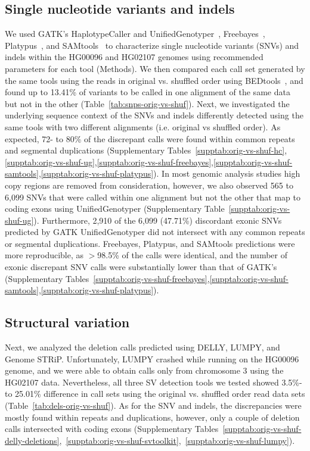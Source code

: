 \documentclass[10pt,a4paper]{article}
\begin{document}
\subsection*{Single nucleotide variants and indels}
We used GATK's HaplotypeCaller and UnifiedGenotyper~\cite{DePristo2011}, Freebayes~\cite{Garrison2012}, Platypus~\cite{Rimmer2014}, and SAMtools~\cite{Li2009b} to characterize
single nucleotide variants (SNVs) and indels within the HG00096 and HG02107 genomes using recommended parameters for each tool (Methods). We then compared each call set generated by the same tools using the reads in original vs. shuffled order using BEDtools~\cite{Quinlan2010a}, and found up to 13.41\% of variants to be called in one alignment of the same data but not in the other (Table~\ref{tab:snps-orig-vs-shuf}).
Next, we investigated the underlying sequence context of the SNVs 
and indels differently detected using the same tools with two different alignments (i.e. original vs shuffled order). 
As expected, 72- to 80\% of the discrepant calls were found within common repeats and segmental duplications (Supplementary Tables~\ref{supptab:orig-vs-shuf-hc},\ref{supptab:orig-vs-shuf-ug},\ref{supptab:orig-vs-shuf-freebayes},\ref{supptab:orig-vs-shuf-samtools},\ref{supptab:orig-vs-shuf-platypus}). 
In most genomic analysis studies high copy regions are removed from consideration, however, we also observed 565 to 6,099 
SNVs that were called within one alignment but not the other that map to coding exons using UnifiedGenotyper (Supplementary Table~\ref{supptab:orig-vs-shuf-ug}). 
Furthermore, 2,910 of the 6,099 (47.71\%) discordant exonic SNVs predicted by GATK UnifiedGenotyper did not intersect with any common repeats or segmental duplications.
Freebayes, Platypus, and SAMtools predictions were more reproducible, as $>$98.5\% of the calls were identical, and the number of exonic discrepant SNV calls were substantially lower than
that of GATK's (Supplementary Tables~\ref{supptab:orig-vs-shuf-freebayes},\ref{supptab:orig-vs-shuf-samtools},\ref{supptab:orig-vs-shuf-platypus}). 

\subsection*{Structural variation}
Next, we analyzed the deletion calls predicted using DELLY, LUMPY, and Genome STRiP. Unfortunately, LUMPY crashed while running on the HG00096 genome, and we were able to obtain calls only from chromosome 3 using the HG02107 data. Nevertheless, all three SV detection tools we tested showed 3.5\%- to 25.01\% difference in call sets using the original vs. shuffled order read data sets (Table~\ref{tab:dels-orig-vs-shuf}). As for the SNV and indels, the discrepancies were mostly found within repeats and duplications, however, only a couple of deletion calls intersected with coding exons (Supplementary Tables~\ref{supptab:orig-vs-shuf-delly-deletions},~\ref{supptab:orig-vs-shuf-svtoolkit},~\ref{supptab:orig-vs-shuf-lumpy}). 
\end{document}
